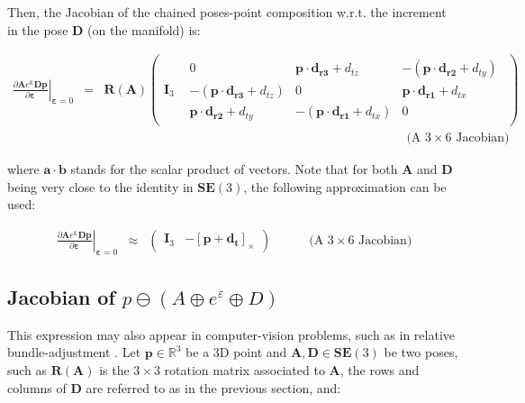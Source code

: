 \documentclass[a4paper,11pt]{report}
\newcommand{\E}{{\bm{\varepsilon}}}
\newcommand{\A}{{\mathbf{A}}}
\newcommand{\D}{{\mathbf{D}}}
\newcommand{\I}{{\mathbf{I}}}
\begin{document}
Then, the Jacobian of the chained poses-point composition w.r.t. 
the increment in the pose $\D$ (on the manifold) is:

\begin{eqnarray}
\left. \frac{\partial \A e^\E \D \mathbf{p}}{\partial \E} \right|_{\E = 0}
&=&
\mathbf{R}(\A)
\left(
\begin{array}{c|c}
  \I_3 &
    \begin{array}{ccc}
      0  & \mathbf{p} \cdot \mathbf{d_{r3}} + d_{tz}  & -(\mathbf{p} \cdot \mathbf{d_{r2}} + d_{ty}) \\
      -(\mathbf{p} \cdot \mathbf{d_{r3}} + d_{tz})  & 0 & \mathbf{p} \cdot \mathbf{d_{r1}} + d_{tx} \\
      \mathbf{p} \cdot \mathbf{d_{r2}} + d_{ty}  & -(\mathbf{p} \cdot \mathbf{d_{r1}} + d_{tx}) & 0 
    \end{array}
\end{array}
\right)
\\
&&
\quad \quad \quad \quad \quad \quad \quad \quad \quad \quad \quad \quad 
\quad \quad \quad \quad \quad \quad \quad \quad \quad \quad \quad \quad 
\text{(A $3 \times 6$ Jacobian)} \nonumber 
\end{eqnarray}

\noindent where $\mathbf{a} \cdot \mathbf{b}$ stands for the scalar product of vectors. 
Note that for both $\A$ and $\D$ being very close to the identity in $\mathbf{SE}(3)$, 
the following approximation can be used:

\begin{eqnarray}
\left. \frac{\partial \A e^\E \D \mathbf{p}}{\partial \E} \right|_{\E = 0}
& \approx &
\left(
\begin{array}{cc}
  \I_3 & 
  -\left[ \mathbf{p} + \mathbf{d_t} \right]_\times
\end{array}
\right)
\quad \quad \quad 
\text{(A $3 \times 6$ Jacobian)} \nonumber 
\end{eqnarray}




\subsection{Jacobian of $p \ominus (A \oplus e^\varepsilon \oplus D)$}

This expression may also appear in computer-vision problems, 
such as in relative bundle-adjustment \cite{sibley2009rba}.
Let $\mathbf{p} \in \mathbb{R}^3$ be a 3D point
and $\A,\D \in \mathbf{SE}(3)$ be two poses, such as 
$\mathbf{R}(\A)$ is the $3\times 3$ rotation matrix associated to $\A$, 
the rows and columns of $\D$ are referred to as in the previous section, 
and:
\end{document}
